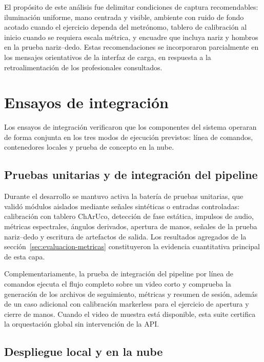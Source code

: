 El propósito de este análisis fue delimitar condiciones de captura recomendables: iluminación uniforme, mano centrada y visible, ambiente con ruido de fondo acotado cuando el ejercicio dependa del metrónomo, tablero de calibración al inicio cuando se requiera escala métrica, y encuadre que incluya nariz y hombros en la prueba nariz--dedo. Estas recomendaciones se incorporaron parcialmente en los mensajes orientativos de la interfaz de carga, en respuesta a la retroalimentación de los profesionales consultados.


\section{Ensayos de integración}
\label{sec:ensayos-integracion}

Los ensayos de integración verificaron que los componentes del sistema operaran de forma conjunta en los tres modos de ejecución previstos: línea de comandos, contenedores locales y prueba de concepto en la nube.

\subsection{Pruebas unitarias y de integración del pipeline}

Durante el desarrollo se mantuvo activa la batería de pruebas unitarias, que validó módulos aislados mediante señales sintéticas o entradas controladas: calibración con tablero ChArUco, detección de fase estática, impulsos de audio, métricas espectrales, ángulos derivados, apertura de manos, señales de la prueba nariz--dedo y escritura de artefactos de salida. Los resultados agregados de la sección~\ref{sec:evaluacion-metricas} constituyeron la evidencia cuantitativa principal de esta capa.

Complementariamente, la prueba de integración del pipeline por línea de comandos ejecuta el flujo completo sobre un video corto y comprueba la generación de los archivos de seguimiento, métricas y resumen de sesión, además de un caso adicional con calibración markerless para el ejercicio de apertura y cierre de manos. Cuando el video de muestra está disponible, esta suite certifica la orquestación global sin intervención de la API.

\subsection{Despliegue local y en la nube}

